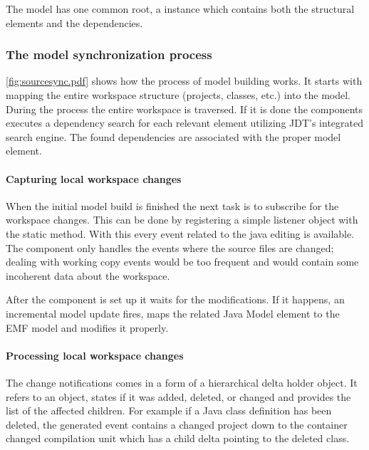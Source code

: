 The model has one common root, a  instance which contains both
the structural elements and the dependencies.

\subsubsection{The model synchronization process}
\autoref{fig:sourcesync.pdf} shows how the process  of model building works. It
starts with mapping the entire workspace structure (projects, classes, etc.)
into the model. During the process the entire workspace is traversed. If it is 
done the components executes a dependency search for each relevant element 
utilizing JDT's integrated search engine. The found dependencies are associated 
with the proper model element.

\paragraph{Capturing local workspace changes}
When the initial model build is finished the next task is to subscribe for the
workspace changes. This can be done by registering a simple listener object with
the   static
method. With this every event related to the java editing is available. The
component only handles the events where the source files are changed; dealing
with working copy events would be too frequent and would contain some incoherent
data about the workspace. 
	
After the component is set up it waits for the modifications. If it happens, an
incremental model update fires, maps the related Java Model element to the EMF
model and modifies it properly. 

\paragraph{Processing local workspace changes}
The change notifications comes in a form of a hierarchical delta holder object.
It refers to an object, states if it was added, deleted, or changed and provides
the list of the affected children. For example if a Java class definition has
been deleted, the generated event contains a changed project down to the
container changed compilation unit which has a child delta pointing to the
deleted class.

